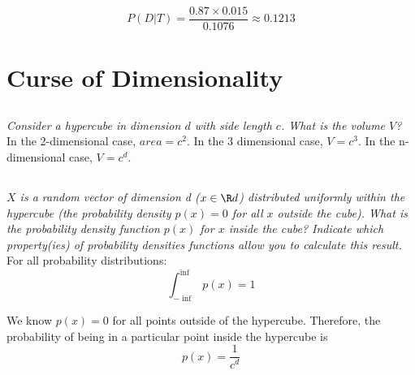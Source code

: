 \documentclass{amsart}
\theoremstyle{definition}
\theoremstyle{remark}
\numberwithin{equation}{section}
\begin{document}
\begin{equation}
    P(D|T) = \frac{0.87 \times 0.015}{0.1076} \approx 0.1213
\end{equation}

\section{Curse of Dimensionality}

\subsection{} 

\textit{Consider a hypercube in dimension $d$ with side length $c$. 
            What is the volume $V$?} \\

In the 2-dimensional case, $area = c^2$. In the 3 dimensional case, $V = c^3$. 
In the n-dimensional case, $V = c^d$. \\

\subsection{} 

\textit{$X$ is a random vector of dimension d ($x \in \R d$) distributed 
uniformly within the hypercube (the probability density  $p(x) = 0$ for all $x$ 
outside the cube). What is the probability density function $p(x)$ for $x$ 
inside  the cube? Indicate which property(ies) of probability densities 
functions allow you to calculate this result.} \\

For all probability distributions: \\

\begin{equation}
    \int_{-\inf}^{\inf}p(x) = 1
\end{equation}

We know $p(x) = 0$ for all points outside of the hypercube. Therefore,
the probability of being in a particular point inside the hypercube is \\

\begin{equation}
    p(x) = \frac{1}{c^d}
\end{equation}

\subsection{} 
\end{document}
